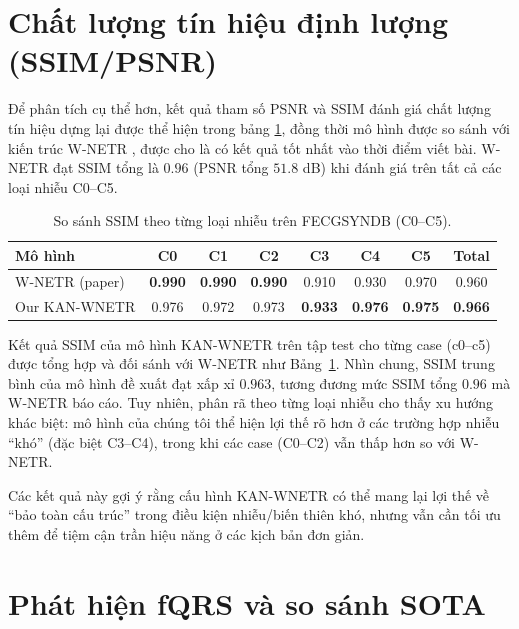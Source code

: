 \documentclass[../DoAn.tex]{subfiles}
\begin{document}
\section{Chất lượng tín hiệu định lượng (SSIM/PSNR)}

Để phân tích cụ thể hơn, kết quả tham số PSNR và SSIM đánh giá chất lượng tín hiệu dựng lại được thể hiện trong bảng \ref{tab:ssim_compare_wnetr}, đồng thời mô hình được so sánh với kiến trúc W-NETR \cite{almadaniOneDimensionalWNETRNonInvasive2023}, được cho là có kết quả tốt nhất vào thời điểm viết bài. W-NETR đạt SSIM tổng là $0.96$ (PSNR tổng $51.8$ dB) khi đánh giá trên tất cả các loại nhiễu C0–C5.

\begin{table}[htbp]
\centering
\caption{So sánh SSIM theo từng loại nhiễu trên FECGSYNDB (C0--C5).}
\label{tab:ssim_compare_wnetr}
\begin{tabular}{lccccccc}
\hline
\textbf{Mô hình} & \textbf{C0} & \textbf{C1} & \textbf{C2} & \textbf{C3} & \textbf{C4} & \textbf{C5} & \textbf{Total} \\
\hline
W-NETR (paper)      & \textbf{0.990} & \textbf{0.990} & \textbf{0.990} & 0.910 & 0.930 & 0.970 & 0.960 \\
Our KAN-WNETR & 0.976 & 0.972 & 0.973 & \textbf{0.933} & \textbf{0.976} & \textbf{0.975} & \textbf{0.966} \\
\hline
\end{tabular}
\end{table}

Kết quả SSIM của mô hình KAN-WNETR trên tập test cho từng case (c0–c5) được tổng hợp và đối sánh với W-NETR như Bảng~\ref{tab:ssim_compare_wnetr}. Nhìn chung, SSIM trung bình của mô hình đề xuất đạt xấp xỉ $0.963$, tương đương mức SSIM tổng $0.96$ mà W-NETR báo cáo. Tuy nhiên, phân rã theo từng loại nhiễu cho thấy xu hướng khác biệt: mô hình của chúng tôi thể hiện lợi thế rõ hơn ở các trường hợp nhiễu “khó” (đặc biệt C3–C4), trong khi các case (C0–C2) vẫn thấp hơn so với W-NETR.

Các kết quả này gợi ý rằng cấu hình KAN-WNETR có thể mang lại lợi thế về “bảo toàn cấu trúc” trong điều kiện nhiễu/biến thiên khó, nhưng vẫn cần tối ưu thêm để tiệm cận trần hiệu năng ở các kịch bản đơn giản.

\section{Phát hiện fQRS và so sánh SOTA}
\end{document}
